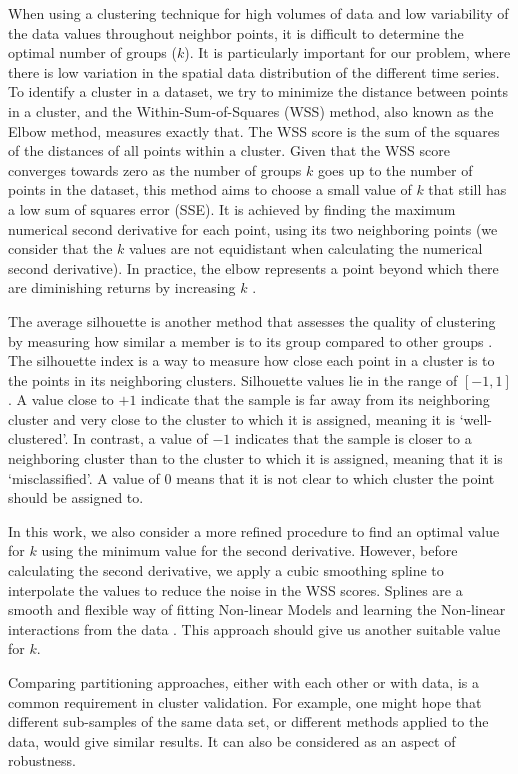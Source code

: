 When using a clustering technique for high volumes of data and low variability of the data values throughout neighbor points, it is difficult to determine the optimal number of groups ($k$). It is particularly important for our problem, where there is low variation in the spatial data distribution of the different time series. To identify a cluster in a dataset, we try to minimize the distance between points in a cluster, and the Within-Sum-of-Squares (WSS) method, also known as the Elbow method, measures exactly that. The WSS score is the sum of the squares of the distances of all points within a cluster. Given that the WSS score converges towards zero as the number of groups $k$ goes up to the number of points in the dataset, this method aims to choose a small value of $k$ that still has a low sum of squares error (SSE). It is achieved by finding the maximum numerical second derivative for each point, using its two neighboring points (we consider that the $k$ values are not equidistant when calculating the numerical second derivative). In practice, the elbow represents a point beyond which there are diminishing returns by increasing $k$ \cite{Han2011}.

The average silhouette is another method that assesses the quality of clustering by measuring how similar a member is to its group compared to other groups \cite{Rousseeuw1987}. The silhouette index is a way to measure how close each point in a cluster is to the points in its neighboring clusters.  Silhouette values lie in the range of $[-1, 1]$. A value close to $+1$ indicate that the sample is far away from its neighboring cluster and very close to the cluster to which it is assigned, meaning it is `well-clustered'. In contrast, a value of $-1$ indicates that the sample is closer to a neighboring cluster than to the cluster to which it is assigned, meaning that it is `misclassified'. A value of $0$ means that it is not clear to which cluster the point should be assigned to. 

In this work, we also consider a more refined procedure to find an optimal value for $k$ using the minimum value for the second derivative. However, before calculating the second derivative, we apply a cubic smoothing spline to interpolate the values to reduce the noise in the WSS scores. Splines are a smooth and flexible way of fitting Non-linear Models and learning the Non-linear interactions from the data \cite{HastieTF2009}. This approach should give us another suitable value for $k$.

Comparing partitioning approaches, either with each other or with data, is a common requirement in cluster validation. For example, one might hope that different sub-samples of the same data set, or different methods applied to the data, would give similar results. It can also be considered as an aspect of robustness.


